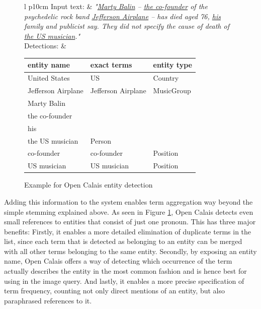 \documentclass[11pt,a4paper,twoside]{article}
\begin{document}
\begin{figure}[ht]
    \caption{Example for Open Calais entity detection \bigskip}
    \centering
    \begin{tabular}{l p{10cm}}
        Input text: & \nohyphens{\emph{"\underline{Marty Balin} -- \underline{the co-founder} of the psychedelic rock band \underline{Jefferson Airplane} -- has died aged 76, \underline{his} family and publicist say. They did not specify the cause of death of \underline{the US musician}."}} \bigskip \\
        
        Detections: & \begin{tabular}{|l|l|l|}
         \hline
         \textbf{entity name} & \textbf{exact terms}        & \textbf{entity type}       \\
         \hline
         United States      & US                            & Country           \\
         \hline
         Jefferson Airplane & Jefferson Airplane            & MusicGroup        \\
         \hline
         Marty Balin        & \pbox{50cm}{\vspace{.2\baselineskip}Marty Balin\\the co-founder\\his\\the US musician\vspace{.3\baselineskip}} & Person            \\
         \hline
         co-founder & co-founder & Position \\
         \hline
         US musician & US musician & Position \\
         \hline
    \end{tabular}
    \end{tabular}
    \label{table:calais-example}
\end{figure}

Adding this information to the system enables term aggregation way beyond the simple stemming explained above. As seen in Figure \ref{table:calais-example}, Open Calais detects even small references to entities that consist of just one pronoun. This has three major benefits: Firstly, it enables a more detailed elimination of duplicate terms in the list, since each term that is detected as belonging to an entity can be merged with all other terms belonging to the same entity. Secondly, by exposing an entity name, Open Calais offers a way of detecting which occurrence of the term actually describes the entity in the most common fashion and is hence best for using in the image query. And lastly, it enables a more precise specification of term frequency, counting not only direct mentions of an entity, but also paraphrased references to it.
\end{document}
